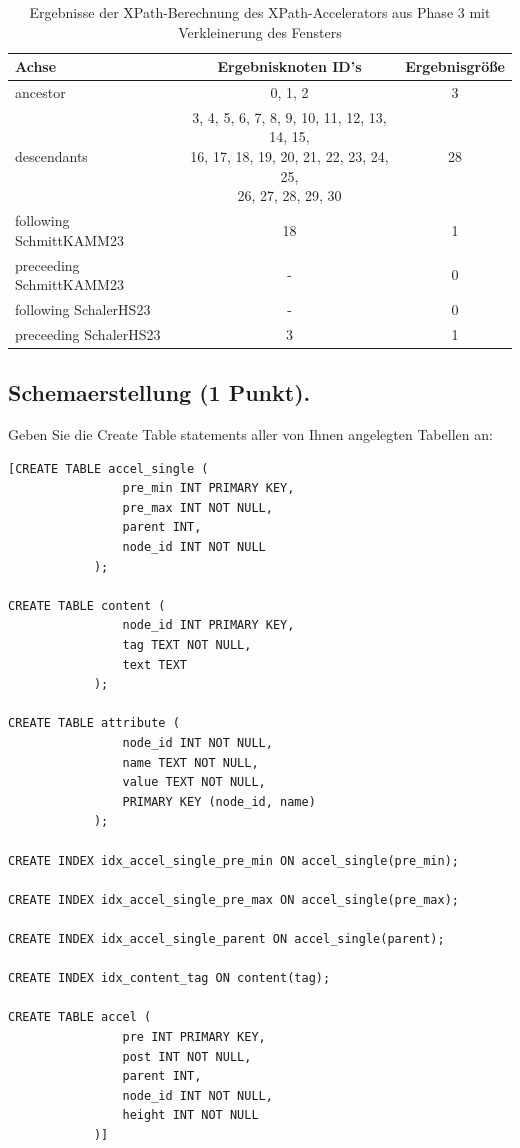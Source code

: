 \documentclass[11pt]{scrartcl}
\begin{document}
\begin{table}[h]
	\centering
		\begin{center}
			\begin{tabular}{ l | c c }
				\toprule
				Achse & Ergebnisknoten ID's & Ergebnisgröße\\
				\midrule
				ancestor & 0, 1, 2 & 3 \\ 
				descendants &
\makecell[l]{3, 4, 5, 6, 7, 8, 9, 10, 11, 12, 13, 14, 15, \\
16, 17, 18, 19, 20, 21, 22, 23, 24, 25, \\
26, 27, 28, 29, 30}
& 28 \\  
				following SchmittKAMM23& 18 & 1 \\  
				preceeding SchmittKAMM23 & - & 0 \\ 
				following SchalerHS23& - & 0 \\  
				preceeding SchalerHS23& 3 & 1 \\ 
				\bottomrule
			\end{tabular}
			\end{center}
	\caption{Ergebnisse der XPath-Berechnung des XPath-Accelerators aus Phase 3 mit Verkleinerung des Fensters}
	\label{tab:ErgebnisseDerXPathBerechnug}
\end{table}



\subsection*{Schemaerstellung (1 Punkt).}
Geben Sie die Create Table statements aller von Ihnen angelegten Tabellen an:
\begin{lstlisting}[style=dmrsql]
[CREATE TABLE accel_single (
                pre_min INT PRIMARY KEY,
                pre_max INT NOT NULL,
                parent INT,
                node_id INT NOT NULL
            );

CREATE TABLE content (
                node_id INT PRIMARY KEY,
                tag TEXT NOT NULL,
                text TEXT
            );

CREATE TABLE attribute (
                node_id INT NOT NULL,
                name TEXT NOT NULL,
                value TEXT NOT NULL,
                PRIMARY KEY (node_id, name)
            );

CREATE INDEX idx_accel_single_pre_min ON accel_single(pre_min);

CREATE INDEX idx_accel_single_pre_max ON accel_single(pre_max);

CREATE INDEX idx_accel_single_parent ON accel_single(parent);

CREATE INDEX idx_content_tag ON content(tag);

CREATE TABLE accel (
                pre INT PRIMARY KEY,
                post INT NOT NULL,
                parent INT,
                node_id INT NOT NULL,
                height INT NOT NULL
            )]
\end{lstlisting}
\end{document}

